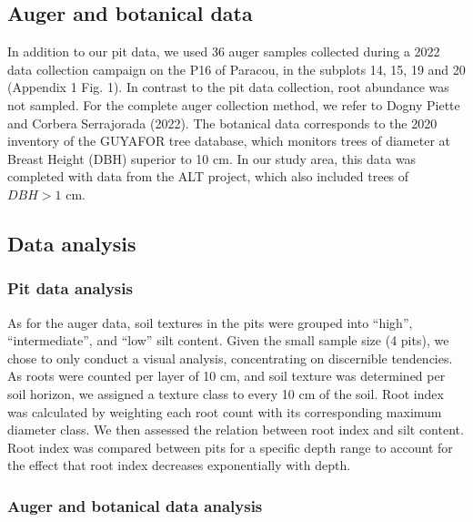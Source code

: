 \documentclass[fleqn,12pt]{latex/stylish_article} %
\begin{document}
\hypertarget{auger-and-botanical-data}{%
\subsection{Auger and botanical data}\label{auger-and-botanical-data}}

In addition to our pit data, we used 36 auger samples collected during a 2022 data collection campaign on the P16 of Paracou, in the subplots 14, 15, 19 and 20 (Appendix 1 Fig. 1). In contrast to the pit data collection, root abundance was not sampled. For the complete auger collection method, we refer to Dogny Piette and Corbera Serrajorada (2022).
The botanical data corresponds to the 2020 inventory of the GUYAFOR tree database, which monitors trees of diameter at Breast Height (DBH) superior to 10 cm. In our study area, this data was completed with data from the ALT project, which also included trees of \(DBH > 1\) cm.

\hypertarget{data-analysis}{%
\subsection{Data analysis}\label{data-analysis}}

\hypertarget{pit-data-analysis}{%
\subsubsection{Pit data analysis}\label{pit-data-analysis}}

As for the auger data, soil textures in the pits were grouped into \enquote{high}, \enquote{intermediate}, and \enquote{low} silt content. Given the small sample size (4 pits), we chose to only conduct a visual analysis, concentrating on discernible tendencies. As roots were counted per layer of 10 cm, and soil texture was determined per soil horizon, we assigned a texture class to every 10 cm of the soil.
Root index was calculated by weighting each root count with its corresponding maximum diameter class. We then assessed the relation between root index and silt content. Root index was compared between pits for a specific depth range to account for the effect that root index decreases exponentially with depth.

\hypertarget{auger-and-botanical-data-analysis}{%
\subsubsection{Auger and botanical data analysis}\label{auger-and-botanical-data-analysis}}
\end{document}

